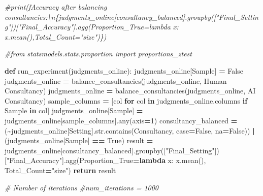 \documentclass[
]{article}
\newenvironment{Shaded}{\begin{snugshade}}{\end{snugshade}}
\newcommand{\BuiltInTok}[1]{#1}
\newcommand{\CommentTok}[1]{\textcolor[rgb]{0.56,0.35,0.01}{\textit{#1}}}
\newcommand{\ControlFlowTok}[1]{\textcolor[rgb]{0.13,0.29,0.53}{\textbf{#1}}}
\newcommand{\DecValTok}[1]{\textcolor[rgb]{0.00,0.00,0.81}{#1}}
\newcommand{\KeywordTok}[1]{\textcolor[rgb]{0.13,0.29,0.53}{\textbf{#1}}}
\newcommand{\NormalTok}[1]{#1}
\newcommand{\OperatorTok}[1]{\textcolor[rgb]{0.81,0.36,0.00}{\textbf{#1}}}
\newcommand{\StringTok}[1]{\textcolor[rgb]{0.31,0.60,0.02}{#1}}
\newcommand{\VariableTok}[1]{\textcolor[rgb]{0.00,0.00,0.00}{#1}}
\begin{document}
\begin{Shaded}
\begin{Highlighting}[]
\CommentTok{\#print(f\textquotesingle{}Accuracy after balancing consultancies:\textbackslash{}n\{judgments\_online[consultancy\_balanced].groupby(["Final\_Setting"])["Final\_Accuracy"].agg(Proportion\_True=lambda x: x.mean(),Total\_Count="size")\}\textquotesingle{})}


\CommentTok{\#from statsmodels.stats.proportion import proportions\_ztest}

\KeywordTok{def}\NormalTok{ run\_experiment(judgments\_online):}
\NormalTok{    judgments\_online[}\StringTok{\textquotesingle{}Sample\textquotesingle{}}\NormalTok{] }\OperatorTok{=} \VariableTok{False}
\NormalTok{    judgments\_online }\OperatorTok{=}\NormalTok{ balance\_consultancies(judgments\_online, }\StringTok{\textquotesingle{}Human Consultancy\textquotesingle{}}\NormalTok{)}
\NormalTok{    judgments\_online }\OperatorTok{=}\NormalTok{ balance\_consultancies(judgments\_online, }\StringTok{\textquotesingle{}AI Consultancy\textquotesingle{}}\NormalTok{)}
\NormalTok{    sample\_columns }\OperatorTok{=}\NormalTok{ [col }\ControlFlowTok{for}\NormalTok{ col }\KeywordTok{in}\NormalTok{ judgments\_online.columns }\ControlFlowTok{if} \StringTok{\textquotesingle{}Sample\textquotesingle{}} \KeywordTok{in}\NormalTok{ col]}
\NormalTok{    judgments\_online[}\StringTok{\textquotesingle{}Sample\textquotesingle{}}\NormalTok{] }\OperatorTok{=}\NormalTok{ judgments\_online[sample\_columns].}\BuiltInTok{any}\NormalTok{(axis}\OperatorTok{=}\DecValTok{1}\NormalTok{)}
\NormalTok{    consultancy\_balanced }\OperatorTok{=}\NormalTok{ (}\OperatorTok{\textasciitilde{}}\NormalTok{judgments\_online[}\StringTok{\textquotesingle{}Setting\textquotesingle{}}\NormalTok{].}\BuiltInTok{str}\NormalTok{.contains(}\StringTok{\textquotesingle{}Consultancy\textquotesingle{}}\NormalTok{, case}\OperatorTok{=}\VariableTok{False}\NormalTok{, na}\OperatorTok{=}\VariableTok{False}\NormalTok{)) }\OperatorTok{|}\NormalTok{ (judgments\_online[}\StringTok{\textquotesingle{}Sample\textquotesingle{}}\NormalTok{] }\OperatorTok{==} \VariableTok{True}\NormalTok{)}
\NormalTok{    result }\OperatorTok{=}\NormalTok{ judgments\_online[consultancy\_balanced].groupby([}\StringTok{"Final\_Setting"}\NormalTok{])[}\StringTok{"Final\_Accuracy"}\NormalTok{].agg(Proportion\_True}\OperatorTok{=}\KeywordTok{lambda}\NormalTok{ x: x.mean(), Total\_Count}\OperatorTok{=}\StringTok{"size"}\NormalTok{)}
    \ControlFlowTok{return}\NormalTok{ result}

\CommentTok{\# Number of iterations}
\CommentTok{\#num\_iterations = 1000}


\end{Highlighting}
\end{Shaded}
\end{document}
